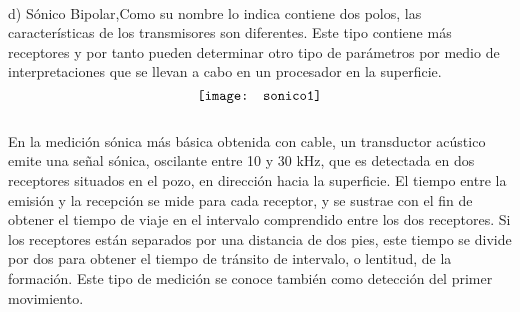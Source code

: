 \documentclass[10pt,a4paper]{report}
\begin{document}
\\ d) Sónico Bipolar,Como su nombre lo indica contiene dos polos, las características de los transmisores son diferentes. Este tipo contiene más receptores y por tanto pueden determinar otro tipo de parámetros por medio de interpretaciones que se llevan a cabo en un procesador en la superficie.
\\ $$\\  \texttt{[image: sonico1]}$$ 
\\ En la medición sónica más básica obtenida con cable, un transductor acústico emite una señal sónica, oscilante entre 10 y 30 kHz, que es detectada en dos receptores situados en el pozo, en dirección hacia la superficie. El tiempo entre la emisión y la recepción se mide para cada receptor, y se sustrae con el fin de obtener el tiempo de viaje en el intervalo comprendido entre los dos receptores. Si los receptores están separados por una distancia de dos pies, este tiempo se divide por dos para obtener el tiempo de tránsito de intervalo, o lentitud, de la formación. Este tipo de medición se conoce también como detección del primer movimiento. 
\end{document}
